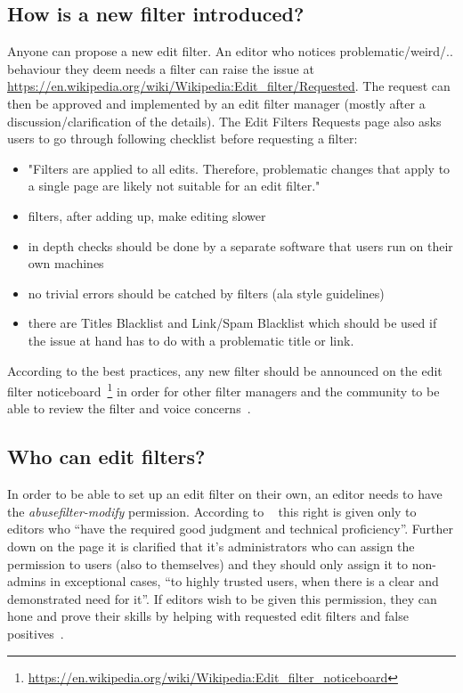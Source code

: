 \documentclass{sigchi}
\begin{document}
\subsection{How is a new filter introduced?}

Anyone can propose a new edit filter.
An editor who notices problematic/weird/.. behaviour they deem needs a filter can raise the issue at \url{https://en.wikipedia.org/wiki/Wikipedia:Edit_filter/Requested}.
The request can then be approved and implemented by an edit filter manager (mostly after a discussion/clarification of the details).
The Edit Filters Requests page also asks users to go through following checklist before requesting a filter:
\begin{itemize}
    \item "Filters are applied to all edits. Therefore, problematic changes that apply to a single page are likely not suitable for an edit filter."
    \item filters, after adding up, make editing slower
    \item in depth checks should be done by a separate software that users run on their own machines
    \item no trivial errors should be catched by filters (ala style guidelines)
    \item there are Titles Blacklist and Link/Spam Blacklist which should be used if the issue at hand has to do with a problematic title or link.
\end{itemize}

According to the best practices, any new filter should be announced on the edit filter noticeboard~\footnote{\url{https://en.wikipedia.org/wiki/Wikipedia:Edit_filter_noticeboard}} in order for other filter managers and the community to be able to review the filter and voice concerns~\cite{Wikipedia:EditFilter}.

\subsection{Who can edit filters?}
\label{subsection:who-can-edit}

In order to be able to set up an edit filter on their own, an editor needs to have the \emph{abusefilter-modify} permission.
According to ~\cite{Wikipedia:EditFilter} this right is given only to editors who ``have the required good judgment and technical proficiency''.
Further down on the page it is clarified that it's administrators who can assign the permission to users (also to themselves) and they should only assign it to non-admins in exceptional cases, ``to highly trusted users, when there is a clear and demonstrated need for it''.
If editors wish to be given this permission, they can hone and prove their skills by helping with requested edit filters and false positives~\cite{Wikipedia:EditFilter}.
\end{document}
